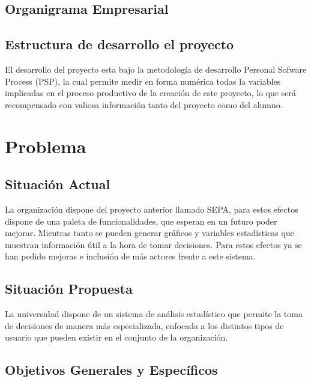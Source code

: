 \documentclass[a4paper,12pt,openany,oneside]{book}
\begin{document}
\section{Organigrama Empresarial}

\section{Estructura de desarrollo el proyecto}
El desarrollo del proyecto esta bajo la metodología de desarrollo Personal Sofware Process (PSP), la cual permite medir en forma numérica todas la variables implicadas en el proceso productivo de la creación de este proyecto, lo que será recompensado con valiosa información tanto del proyecto como del alumno.
\chapter{Problema}
\thispagestyle{empty}
\section{Situación Actual}
La organización dispone del proyecto anterior llamado SEPA, para estos efectos dispone de una paleta de funcionalidades, que esperan en un futuro poder mejorar. Mientras tanto se pueden generar gráficos y variables estadísticas que muestran información útil a la hora de tomar decisiones. Para estos efectos ya se han pedido mejoras e inclusión de más actores frente a este sistema.
\section{Situación Propuesta}
La universidad dispone de un sistema de análisis estadístico que permite la toma de decisiones de manera más especializada, enfocada a los distintos tipos de usuario que pueden existir en el conjunto de la organización.
\section{Objetivos Generales y Específicos}
\end{document}

